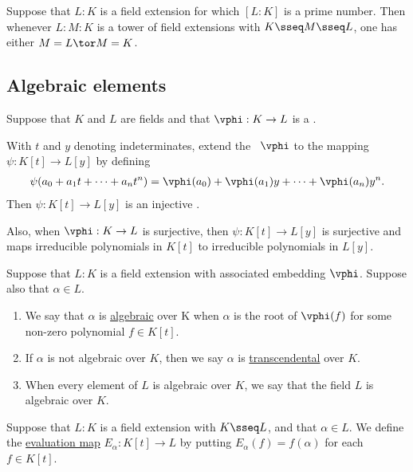 \documentclass{article}
\begin{document}
  \begin{tcorollary}
    Suppose that \( L:K \) is a field extension for which \( [L: K] \) is a prime number.
    Then whenever \( L : M : K \) is a tower of field extensions with \( K \sseq M \sseq L \), one has either \( M= L \tor M= K \).
  \end{tcorollary}

\subsection{Algebraic elements}
  \begin{tproposition}
    Suppose that \( K \) and \( L \) are fields and that \( \vphi : K \to L \) is a \homo.

    With \( t \) and \( y \) denoting indeterminates, extend the \homo~\( \vphi \) to the mapping \( \psi: K[t] \to L[y] \) by defining \begin{align*}
      \psi(a_0 + a_1t+\cdots + a_n t^n) = \vphi(a_0) + \vphi(a_1)y+\cdots + \vphi(a_n)y^n.
    \end{align*}
    Then \( \psi:K[t]\to L[y] \) is an injective \homo.

    Also, when \( \vphi:K\to L \) is surjective, then \( \psi: K[t]\to L[y] \) is surjective and maps irreducible polynomials in \( K[t] \) to irreducible polynomials in \( L[y] \).
  \end{tproposition}

  \begin{tdefinition}
    Suppose that \( L: K \) is a field extension with associated embedding \( \vphi \).
    Suppose also that \( \alpha\in L \).
\begin{enumerate}[label=(\roman*)]
      \item We say that \( \alpha \) is \ul{algebraic} over K when \( \alpha \) is the root of \( \vphi(f) \) for some non-zero polynomial \( f \in K[t] \).
      \item If \( \alpha \) is not algebraic over \( K \), then we say \( \alpha \) is \ul{transcendental} over \( K \).
      \item When every element of \( L \) is algebraic over \( K \), we say that the field \( L \) is algebraic over \( K \).
    \end{enumerate}
  \end{tdefinition}

  \begin{tdefinition}
    Suppose that \( L: K \) is a field extension with \( K \sseq L \), and that \( \alpha\in L \).
    We define the \ul{evaluation map} \( E_\alpha : K[t] \to L \) by putting \( E_\alpha(f) = f(\alpha) \) for each \( f \in K[t] \).
  \end{tdefinition}
\end{document}
